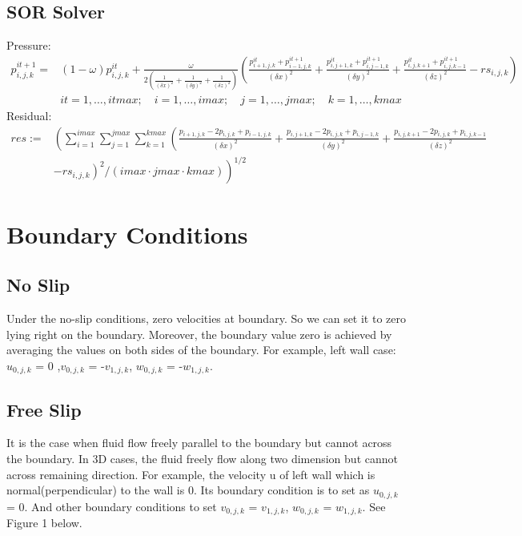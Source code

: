 \documentclass{article}%
\begin{document}
\subsection{SOR Solver}
Pressure:\\
\begin{equation}
\begin{split}
p^{it+1}_{i,j,k} = & (1 - \omega) p^{it}_{i,j,k} + \frac{\omega}{2 (\frac{1}{(\delta x)^2} + \frac{1}{(\delta y)^2} + \frac{1}{(\delta z)^2})} \left( \frac{p^{it}_{i+1,j,k} + p^{it+1}_{i-1,j,k}}{(\delta x)^2} + \frac{p^{it}_{i,j+1,k} + p^{it+1}_{i,j-1,k}}{(\delta y)^2} + \frac{p^{it}_{i,j,k+1} + p^{it+1}_{i,j,k-1}}{(\delta z)^2} - rs_{i,j,k} \right)\\
& it = 1,\ldots,itmax; \quad i = 1,\ldots,imax; \quad j = 1,\ldots,jmax; \quad k = 1,\ldots,kmax
\end{split}
\end{equation}
Residual:\\
\begin{equation}
\begin{split}
res := & \left( \sum_{i=1}^{imax} \sum_{j=1}^{jmax} \sum_{k=1}^{kmax} \left( \frac{p_{i+1,j,k} - 2 p_{i,j,k} + p_{i-1,j,k}}{(\delta x)^2} + \frac{p_{i,j+1,k} - 2 p_{i,j,k} + p_{i,j-1,k}}{(\delta y)^2} + \frac{p_{i,j,k+1} - 2 p_{i,j,k} + p_{i,j,k-1}}{(\delta z)^2} \right. \right. \\
& \left. \left. - rs_{i,j,k} \right)^2 / (imax \cdot jmax \cdot kmax) \right)^{1/2}
\end{split}
\end{equation}
\section{Boundary Conditions}
\subsection{No Slip} 
Under the no-slip conditions, zero velocities at boundary. So we can set it to zero lying right on the boundary. Moreover, the boundary value zero is achieved by averaging the values on both sides of the boundary. For example, left wall case: $u_{0,j,k}$ = 0 ,$v_{0,j,k}$ = -$v_{1,j,k}$, $w_{0,j,k}$ = -$w_{1,j,k}$.
\subsection{Free Slip} 
It is the case when fluid flow freely parallel to the boundary but cannot across the boundary. In 3D cases, the fluid freely flow along two dimension but cannot across remaining direction. For example, the velocity u of left wall which is normal(perpendicular) to the wall is 0. Its boundary condition is to set as $u_{0,j,k}$ = 0. And other boundary conditions to set $v_{0,j,k}$ = $v_{1,j,k}$, $w_{0,j,k}$ = $w_{1,j,k}$. See Figure 1 below.
\end{document}
